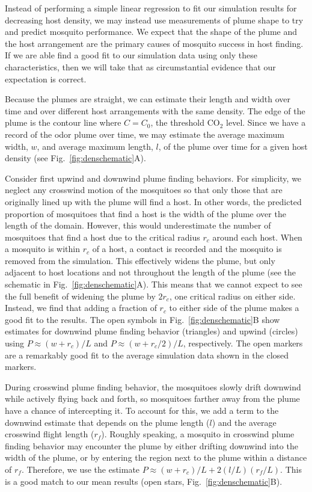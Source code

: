 \documentclass[10pt]{article}
\date{}
\begin{document}
Instead of performing a simple linear regression to fit our simulation results for decreasing host density, we may instead use measurements of plume shape to try and predict mosquito performance. We expect that the shape of the plume and the host arrangement are the primary causes of mosquito success in host finding. If we are able find a good fit 
to our simulation data using only these characteristics, then we will take that as circumstantial evidence that our expectation is correct. 

Because the plumes are straight, we can estimate their length and width over time and over different host arrangements with the same density. The edge of the plume is the contour line where $C = C_0$, the threshold CO$_2$ level. Since we have a record of the odor plume over time, we may estimate the average maximum width, $w$, and average maximum length, $l$, of the plume over time for a given host density (see Fig.~\ref{fig:denschematic}A).

Consider first upwind and downwind plume finding behaviors. For simplicity, we neglect any crosswind motion of the mosquitoes so that only those  that are originally lined up with the plume will find a host. In other words, the predicted proportion of mosquitoes that find a host is the width of the plume over the length of the domain. However, this would underestimate the number of mosquitoes that find a host due to the critical radius $r_c$ around each host. When a mosquito is within $r_c$ of a host, a contact is recorded and the mosquito is removed from the simulation. This effectively widens the plume, but only adjacent to host locations and not throughout the length of the plume (see the schematic in Fig.~\ref{fig:denschematic}A). This means that we cannot expect to see the full benefit of widening the plume by $2r_c$, one critical radius on either side. Instead, we find that adding a fraction of $r_c$ to either side of the plume makes a good fit to the results.
The open symbols in Fig.~\ref{fig:denschematic}B show estimates for downwind plume finding behavior (triangles) and upwind (circles) using  $P \approx (w+r_c)/L$ and $P \approx (w+r_c/2)/L$, respectively.  The open markers are a remarkably good fit to the average simulation data shown in the closed markers.


During crosswind plume finding behavior, the mosquitoes slowly drift downwind while actively flying back and forth, so mosquitoes farther away from the plume have a chance of intercepting it. To account for this, we add a term to the downwind estimate that depends on the plume length ($l$) and the average crosswind flight length ($r_f$).  Roughly speaking, a mosquito in crosswind plume finding behavior may encounter the plume by either drifting downwind into the width of the plume, or by entering the region next to the plume within a distance of $r_f$. Therefore, we use the estimate $P \approx (w+r_c)/L + 2(l/L)(r_f/L)$. This is a good match to our mean results (open stars, Fig.~\ref{fig:denschematic}B).
\end{document}
